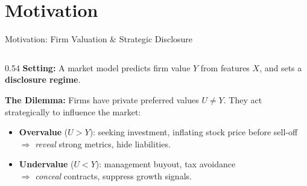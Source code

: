 \documentclass[aspectratio=169, 10pt]{beamer}
\begin{document}
\section{Motivation}

\begin{frame}{Motivation: Firm Valuation \& Strategic Disclosure}
  \begin{columns}[T]

    \begin{column}{0.54\textwidth}
      \textbf{Setting:} A market model predicts firm value $Y$ from features $X$, and sets a \textbf{disclosure regime}.
      \vspace{8pt}

      \textbf{The Dilemma:} Firms have private preferred values $U \neq Y$. They act strategically to influence the market:
      
      \vspace{6pt}
      \begin{itemize}\setlength{\itemsep}{6pt}
        \item[\textcolor{successGreen}{\textbullet}]
          \textcolor{successGreen}{\textbf{Overvalue} ($U > Y$):} seeking investment,
          inflating stock price before sell-off\\
          $\Rightarrow$ \textit{reveal} strong metrics, hide liabilities.

        \item[\textcolor{accentCoral}{\textbullet}]
          \textcolor{accentCoral}{\textbf{Undervalue} ($U < Y$):} management buyout,
          tax avoidance\\
          $\Rightarrow$ \textit{conceal} contracts, suppress growth signals.
      \end{itemize}
    \end{column}


\end{columns}
\end{frame}
\end{document}
